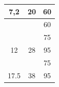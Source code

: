 \begin{table}[H]
\begin{tabular}{|c|c|c|}
\multirow{-2}{*}{7,2}                                                                                                 & \multirow{-2}{*}{20}                                                                                                                                 & 60                                                                                                                                 \\ \hline
                                                                                                                      &                                                                                                                                                      & 60                                                                                                                                 \\
                                                                                                                      &                                                                                                                                                      & 75                                                                                                                                 \\
\multirow{-3}{*}{12}                                                                                                  & \multirow{-3}{*}{28}                                                                                                                                 & 95                                                                                                                                 \\ \hline
                                                                                                                      &                                                                                                                                                      & 75                                                                                                                                 \\
\multirow{-2}{*}{17.5}                                                                                                & \multirow{-2}{*}{38}                                                                                                                                 & 95                                                                                                                                 \\ \hline

\end{tabular}
\end{table}
